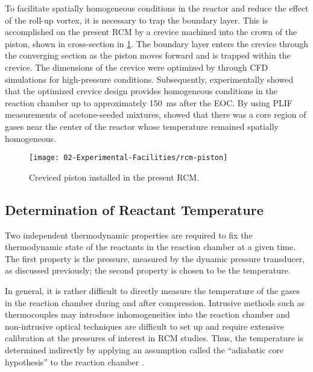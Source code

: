 \documentclass[../main.tex]{subfiles}
\begin{document}
To facilitate spatially homogeneous conditions in the reactor
and reduce the effect of the roll-up vortex, it is necessary to trap
the boundary layer. This is accomplished on the present RCM by a
crevice machined into the crown of the piston, shown in cross-section
in \cref{fig:rcm-piston}. The boundary layer enters the crevice through
the converging section as the piston moves forward and is trapped
within the crevice. The dimensions of the crevice were optimized
by \textcite{Mittal2006a} through CFD simulations for high-pressure
conditions. Subsequently, \textcite{Mittal2006b} experimentally showed that
the optimized crevice design provides homogeneous conditions in the
reaction chamber up to approximately \SI{150}{\milli\second} after the EOC.
By using PLIF measurements of acetone-seeded mixtures,
\textcite{Mittal2006b} showed that there was a core region of gases
near the center of the reactor whose temperature remained spatially
homogeneous.

\begin{figure}[!ht]
    \texttt{[image: 02-Experimental-Facilities/rcm-piston]}
    \caption{Creviced piston installed in the present RCM.}
    \label{fig:rcm-piston}
\end{figure}

\subsection{Determination of Reactant Temperature}

Two independent thermodynamic properties are required to fix the
thermodynamic state of the reactants in the reaction chamber at a
given time. The first property is the pressure, measured by the dynamic
pressure transducer, as discussed previously; the second property
is chosen to be the temperature.

In general, it is rather difficult to directly measure the temperature
of the gases in the reaction chamber during and after compression.
Intrusive methods such as thermocouples may introduce inhomogeneities into
the reaction chamber and non-intrusive optical techniques are difficult to set up
and require extensive calibration at the pressures of interest in RCM
studies. Thus, the temperature is determined indirectly by applying an
assumption called the ``adiabatic core hypothesis'' to the reaction chamber
\cite{Mittal2007, Lee1998}.
\end{document}
